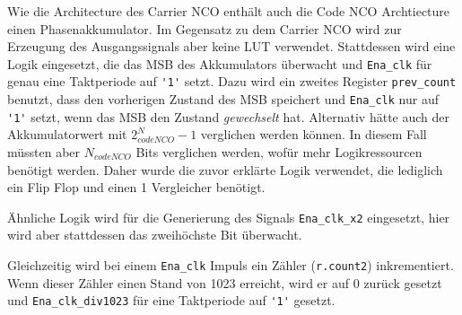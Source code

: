Wie die Architecture des Carrier NCO enthält auch die Code NCO Archtiecture einen Phasenakkumulator. Im Gegensatz zu dem Carrier NCO wird zur Erzeugung des Ausgangssignals aber keine \gls{LUT} verwendet. Stattdessen wird eine Logik eingesetzt, die das MSB des Akkumulators überwacht und \lstinline$Ena_clk$ für genau eine Taktperiode auf \lstinline$'1'$ setzt. Dazu wird ein zweites Register \lstinline$prev_count$ benutzt, dass den vorherigen Zustand des MSB speichert und \lstinline$Ena_clk$ nur auf \lstinline$'1'$ setzt, wenn das MSB den Zustand \emph{gewechselt} hat. Alternativ hätte auch der Akkumulatorwert mit $2^N_{codeNCO}-1$ verglichen werden können. In diesem Fall müssten aber $N_{codeNCO}$ Bits verglichen werden, wofür mehr Logikressourcen benötigt werden. Daher wurde die zuvor erklärte Logik verwendet, die lediglich ein Flip Flop und einen \SI{1}{\bit} Vergleicher benötigt.

Ähnliche Logik wird für die Generierung des Signals \lstinline$Ena_clk_x2$ eingesetzt, hier wird aber stattdessen das zweihöchste Bit überwacht.

Gleichzeitig wird bei einem \lstinline$Ena_clk$ Impuls ein Zähler (\lstinline$r.count2$) inkrementiert. Wenn dieser Zähler einen Stand von 1023 erreicht, wird er auf $0$ zurück gesetzt und \lstinline$Ena_clk_div1023$ für eine Taktperiode auf \lstinline$'1'$ gesetzt.

